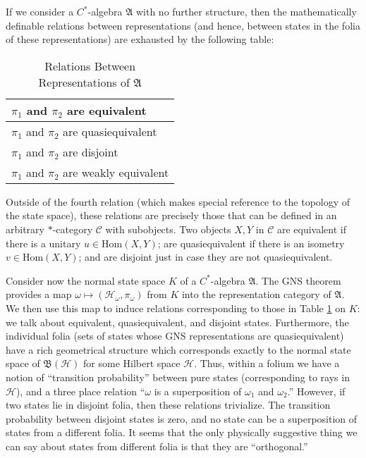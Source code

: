 \documentclass[12pt]{article}
\newcommand{\alg}[1]{\mathfrak{#1}}
\newcommand{\bh}{\mathfrak{B}(\mathcal{H})}
\theoremstyle{definition}
\theoremstyle{definition}
\theoremstyle{remark}
\def\2#1{{\mathcal #1}}
\def\al#1{{\mathfrak #1}}
\def\om{\omega} \def\Om{\Omega} \def\dd{\partial} \def\D{\Delta}
\newcommand{\Hom}{\mathrm{Hom}}
\begin{document}
If we consider a $C^*$-algebra $\alg{A}$ with no
further structure, then the mathematically definable
relations between representations (and hence, between
states in the folia of these representations) are
exhausted by the following table: 
\begin{table}[h] \begin{center}
\begin{tabular}{||l||}
  \hline \hline $\pi _1$ and $\pi _2$ are equivalent   \\ 
  \hline $\pi _1$ and $\pi _2$ are quasiequivalent  \\
  \hline $\pi _1$ and $\pi _2$ are disjoint   \\
  \hline $\pi _1$ and $\pi _2$ are weakly equivalent  \\
  \hline \hline \end{tabular} \caption{Relations Between Representations
  of $\alg{A}$} \label{coarse} \end{center} \end{table}

\noindent Outside of the fourth relation (which makes
special reference to the topology of the state space),
these relations are precisely those that can be defined
in an arbitrary $*$-category $\2C$ with subobjects.
Two objects $X,Y$ in $\2C$ are equivalent if there is a
unitary $u\in \Hom (X,Y)$; are quasiequivalent if there
is an isometry $v\in \Hom (X,Y)$; and are disjoint just
in case they are not quasiequivalent.

Consider now the normal state space $K$ of a $C^*$-algebra $\al A$.
The GNS theorem provides a map $\om \mapsto (\2H _\om ,\pi _\om )$
from $K$ into the representation category of $\al A$.  We then use
this map to induce relations corresponding to those in Table
\ref{coarse} on $K$: we talk about equivalent, quasiequivalent, and
disjoint states.  Furthermore, the individual folia (sets of states
whose GNS representations are quasiequivalent) have a rich geometrical
structure which corresponds exactly to the normal state space of $\bh$
for some Hilbert space $\2H$.  Thus, within a folium we have a notion
of ``transition probability'' between pure states (corresponding to
rays in $\2H$), and a three place relation ``$\om$ is a superposition
of $\om _1$ and $\om _2$.''  However, if two states lie in disjoint
folia, then these relations trivialize.  The transition probability
between disjoint states is zero, and no state can be a superposition
of states from a different folia.  It seems that the only physically
suggestive thing we can say about states from different folia is that
they are ``orthogonal.''
\end{document}
